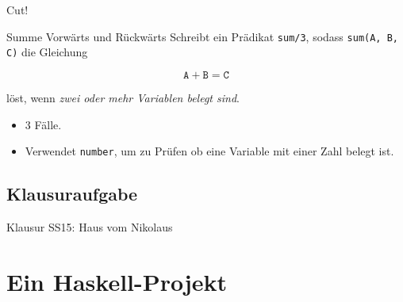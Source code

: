 \documentclass{beamer}
\begin{document}
\begin{frame}{Cut!}
\end{frame}

\begin{frame}{Summe Vorwärts und Rückwärts}
    Schreibt ein Prädikat \texttt{sum/3}, sodass \texttt{sum(A, B, C)} die Gleichung

    \begin{equation*}
        \texttt{A} + \texttt{B} = \texttt{C}
    \end{equation*}

    löst, wenn \emph{zwei oder mehr Variablen belegt sind}.

    \begin{itemize}
        \item 3 Fälle.
        \item Verwendet \texttt{number}, um zu Prüfen ob eine Variable mit einer Zahl belegt ist.
    \end{itemize}
\end{frame}

\subsection{Klausuraufgabe}

\begin{frame}{Klausur SS15: Haus vom Nikolaus}
\end{frame}

\section{Ein Haskell-Projekt}
\end{document}
